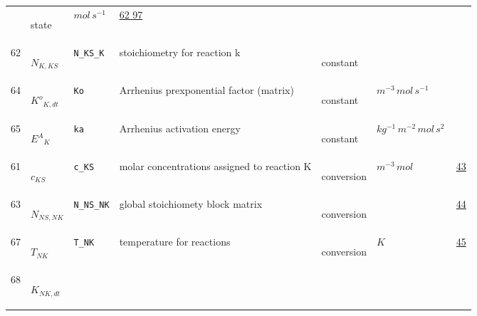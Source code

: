 \begin{longtable}{|p{1cm}|p{3cm}|p{5cm}|p{7.5cm}|p{3.0cm}|p{3cm}|p{1cm}|}
             & \begin{lay}state \end{lay}
             & $ mol \,s^{-1} \, $
             & \hyperlink{"e:62"}{ 62 }
                 \hyperlink{"e:97"}{ 97 }
                 \\
    62
             & \hypertarget{"v:62"}{ $ {N}_{K, {K S}} $}
             & \verb|N_KS_K|
             & stoichiometry for reaction k
             & \begin{lay}constant \end{lay}
             & $  $
             & \\
    64
             & \hypertarget{"v:64"}{ $ {K^{o}}_{K, dt} $}
             & \verb|Ko|
             & Arrhenius prexponential factor (matrix)
             & \begin{lay}constant \end{lay}
             & $ m^{-3} \,mol \,s^{-1} \, $
             & \\
    65
             & \hypertarget{"v:65"}{ $ {E^{A}}_{K} $}
             & \verb|ka|
             & Arrhenius activation energy 
             & \begin{lay}constant \end{lay}
             & $ kg^{-1} \,m^{-2} \,mol \,s^{2} \, $
             & \\
    61
             & \hypertarget{"v:61"}{ $ {c}_{{K S}} $}
             & \verb|c_KS|
             & molar concentrations assigned to reaction K
             & \begin{lay}conversion \end{lay}
             & $ m^{-3} \,mol \, $
             & \hyperlink{"e:43"}{ 43 }
                 \\
    63
             & \hypertarget{"v:63"}{ $ {N}_{{N S}, {N K}} $}
             & \verb|N_NS_NK|
             & global stoichiomety block matrix
             & \begin{lay}conversion \end{lay}
             & $  $
             & \hyperlink{"e:44"}{ 44 }
                 \\
    67
             & \hypertarget{"v:67"}{ $ {T}_{{N K}} $}
             & \verb|T_NK|
             & temperature for reactions
             & \begin{lay}conversion \end{lay}
             & $ K \, $
             & \hyperlink{"e:45"}{ 45 }
                 \\
    68
             & \hypertarget{"v:68"}{ $ {K}_{{N K}, dt} $}

\end{longtable}
